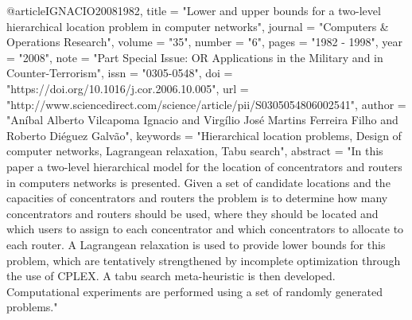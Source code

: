 @article{IGNACIO20081982,
title = "Lower and upper bounds for a two-level hierarchical location problem in computer networks",
journal = "Computers & Operations Research",
volume = "35",
number = "6",
pages = "1982 - 1998",
year = "2008",
note = "Part Special Issue: OR Applications in the Military and in Counter-Terrorism",
issn = "0305-0548",
doi = "https://doi.org/10.1016/j.cor.2006.10.005",
url = "http://www.sciencedirect.com/science/article/pii/S0305054806002541",
author = "Aníbal Alberto Vilcapoma Ignacio and Virgílio José Martins Ferreira Filho and Roberto Diéguez Galvão",
keywords = "Hierarchical location problems, Design of computer networks, Lagrangean relaxation, Tabu search",
abstract = "In this paper a two-level hierarchical model for the location of concentrators and routers in computers networks is presented. Given a set of candidate locations and the capacities of concentrators and routers the problem is to determine how many concentrators and routers should be used, where they should be located and which users to assign to each concentrator and which concentrators to allocate to each router. A Lagrangean relaxation is used to provide lower bounds for this problem, which are tentatively strengthened by incomplete optimization through the use of CPLEX. A tabu search meta-heuristic is then developed. Computational experiments are performed using a set of randomly generated problems."
}